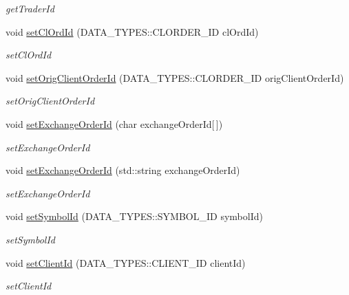 \begin{DoxyCompactItemize}
\begin{DoxyCompactList}\small\item\em get\-Trader\-Id \end{DoxyCompactList}\item 
void \hyperlink{class_a_p_i2_1_1_single_order_abb9a1a8e18fec11a161a5cb486381666}{set\-Cl\-Ord\-Id} (D\-A\-T\-A\-\_\-\-T\-Y\-P\-E\-S\-::\-C\-L\-O\-R\-D\-E\-R\-\_\-\-I\-D cl\-Ord\-Id)
\begin{DoxyCompactList}\small\item\em set\-Cl\-Ord\-Id \end{DoxyCompactList}\item 
void \hyperlink{class_a_p_i2_1_1_single_order_a6c27c70364b6715684e915e406ec48fd}{set\-Orig\-Client\-Order\-Id} (D\-A\-T\-A\-\_\-\-T\-Y\-P\-E\-S\-::\-C\-L\-O\-R\-D\-E\-R\-\_\-\-I\-D orig\-Client\-Order\-Id)
\begin{DoxyCompactList}\small\item\em set\-Orig\-Client\-Order\-Id \end{DoxyCompactList}\item 
void \hyperlink{class_a_p_i2_1_1_single_order_a411efe2e7dd4080416392a2247268528}{set\-Exchange\-Order\-Id} (char exchange\-Order\-Id\mbox{[}$\,$\mbox{]})
\begin{DoxyCompactList}\small\item\em set\-Exchange\-Order\-Id \end{DoxyCompactList}\item 
void \hyperlink{class_a_p_i2_1_1_single_order_ae1a322de9808b4b4eb8755c34fafdf99}{set\-Exchange\-Order\-Id} (std\-::string exchange\-Order\-Id)
\begin{DoxyCompactList}\small\item\em set\-Exchange\-Order\-Id \end{DoxyCompactList}\item 
void \hyperlink{class_a_p_i2_1_1_single_order_ae0b03ccb44dd80e14ca40d5ae459ec95}{set\-Symbol\-Id} (D\-A\-T\-A\-\_\-\-T\-Y\-P\-E\-S\-::\-S\-Y\-M\-B\-O\-L\-\_\-\-I\-D symbol\-Id)
\begin{DoxyCompactList}\small\item\em set\-Symbol\-Id \end{DoxyCompactList}\item 
void \hyperlink{class_a_p_i2_1_1_single_order_a77a799ca5c1e545dba6fe9be6be6ecb2}{set\-Client\-Id} (D\-A\-T\-A\-\_\-\-T\-Y\-P\-E\-S\-::\-C\-L\-I\-E\-N\-T\-\_\-\-I\-D client\-Id)
\begin{DoxyCompactList}\small\item\em set\-Client\-Id \end{DoxyCompactList}\item 

\end{DoxyCompactItemize}
